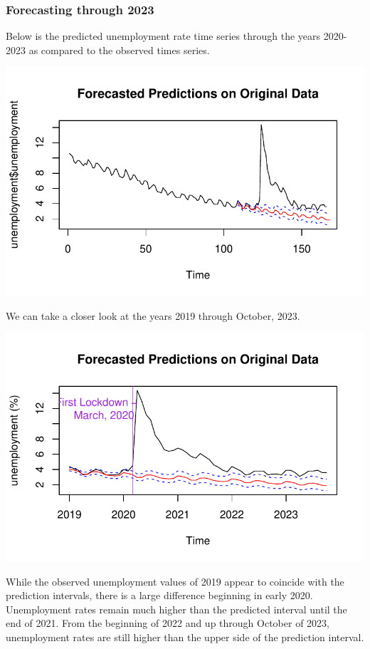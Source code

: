 \documentclass[
  letterpaper,
  DIV=11,
  numbers=noendperiod]{scrartcl}
\begin{document}
\hypertarget{forecasting-through-2023}{%
\subsubsection{Forecasting through
2023}\label{forecasting-through-2023}}

Below is the predicted unemployment rate time series through the years
2020-2023 as compared to the observed times series.

\includegraphics{Final_Project_files/figure-pdf/unnamed-chunk-39-1.pdf}

We can take a closer look at the years 2019 through October, 2023.

\includegraphics{Final_Project_files/figure-pdf/unnamed-chunk-40-1.pdf}

While the observed unemployment values of 2019 appear to coincide with
the prediction intervals, there is a large difference beginning in early
2020. Unemployment rates remain much higher than the predicted interval
until the end of 2021. From the beginning of 2022 and up through October
of 2023, unemployment rates are still higher than the upper side of the
prediction interval.
\end{document}
